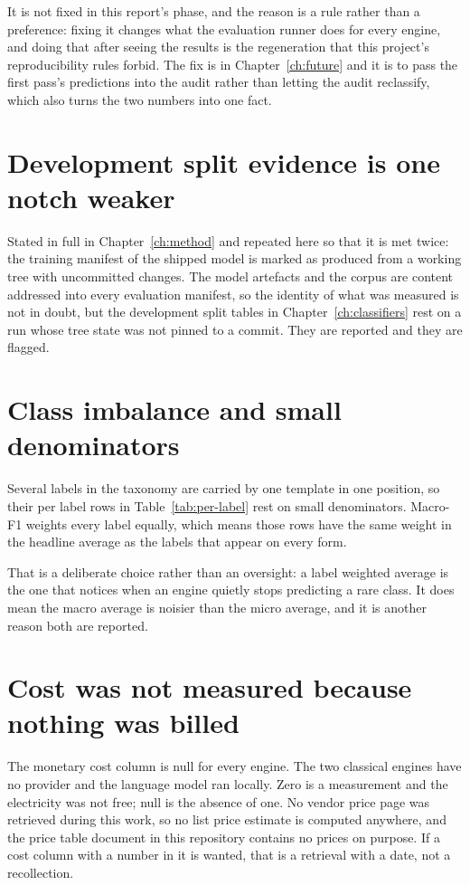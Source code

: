 It is not fixed in this report's phase, and the reason is a rule rather than a
preference: fixing it changes what the evaluation runner does for every engine,
and doing that after seeing the results is the regeneration that this project's
reproducibility rules forbid. The fix is in Chapter~\ref{ch:future} and it is to
pass the first pass's predictions into the audit rather than letting the audit
reclassify, which also turns the two numbers into one fact.

\section{Development split evidence is one notch weaker}

Stated in full in Chapter~\ref{ch:method} and repeated here so that it is met
twice: the training manifest of the shipped model is marked as produced from a
working tree with uncommitted changes. The model artefacts and the corpus are
content addressed into every evaluation manifest, so the identity of what was
measured is not in doubt, but the development split tables in
Chapter~\ref{ch:classifiers} rest on a run whose tree state was not pinned to a
commit. They are reported and they are flagged.

\section{Class imbalance and small denominators}

Several labels in the taxonomy are carried by one template in one position, so
their per label rows in Table~\ref{tab:per-label} rest on small denominators.
Macro-F1 weights every label equally, which means those rows have the same weight
in the headline average as the labels that appear on every form.

That is a deliberate choice rather than an oversight: a label weighted average is
the one that notices when an engine quietly stops predicting a rare class. It
does mean the macro average is noisier than the micro average, and it is another
reason both are reported.

\section{Cost was not measured because nothing was billed}

The monetary cost column is null for every engine. The two classical engines have
no provider and the language model ran locally. Zero is a measurement and the
electricity was not free; null is the absence of one. No vendor price page was
retrieved during this work, so no list price estimate is computed anywhere, and
the price table document in this repository contains no prices on purpose. If a
cost column with a number in it is wanted, that is a retrieval with a date, not a
recollection.

